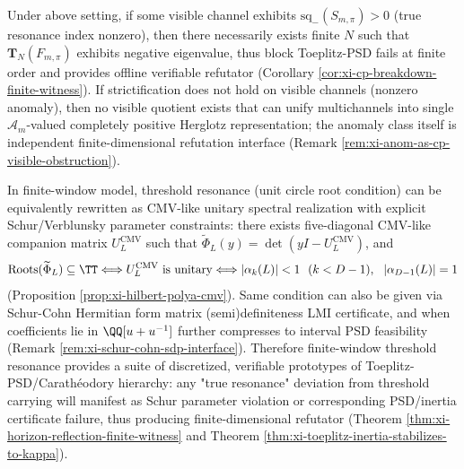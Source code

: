 \begin{corollary}[True resonance or strictification failure \texorpdfstring{$\Rightarrow$}{=>} finite-dimensional refutator]\label{cor:xi-multichannel-witness-kappa-or-anom}
Under above setting, if some visible channel exhibits \(\mathrm{sq}_-(S_{m,\pi})>0\) (true resonance index nonzero),
then there necessarily exists finite \(N\) such that \(\mathbf{T}_N(F_{m,\pi})\) exhibits negative eigenvalue, thus block Toeplitz-PSD fails at finite order and provides offline verifiable refutator (Corollary \ref{cor:xi-cp-breakdown-finite-witness}).
If strictification does not hold on visible channels (nonzero anomaly), then no visible quotient exists that can unify multichannels into single \(\mathcal{A}_m\)-valued completely positive Herglotz representation; the anomaly class itself is independent finite-dimensional refutation interface (Remark \ref{rem:xi-anom-as-cp-visible-obstruction}).
\end{corollary}

\begin{theorem}\label{thm:xi-finite-window-threshold-resonance-inverse-spectral}
In finite-window model, threshold resonance (unit circle root condition) can be equivalently rewritten as CMV-like unitary spectral realization with explicit Schur/Verblunsky parameter constraints:
there exists five-diagonal CMV-like companion matrix \(U_L^{\mathrm{CMV}}\) such that
\(\widetilde\Phi_L(y)=\det(yI-U_L^{\mathrm{CMV}})\), and
\[
\mathrm{Roots}(\widetilde\Phi_L)\subseteq\TT
\Longleftrightarrow
U_L^{\mathrm{CMV}}\ \text{is unitary}
\Longleftrightarrow
|\alpha_k(L)|<1\ \ (k< D-1),\ \ |\alpha_{D-1}(L)|=1
\]
(Proposition \ref{prop:xi-hilbert-polya-cmv}).
Same condition can also be given via Schur-Cohn Hermitian form matrix (semi)definiteness LMI certificate, and when coefficients lie in \(\QQ[u+u^{-1}]\) further compresses to interval PSD feasibility (Remark \ref{rem:xi-schur-cohn-sdp-interface}).
Therefore finite-window threshold resonance provides a suite of discretized, verifiable prototypes of Toeplitz-PSD/Carathéodory hierarchy: any "true resonance" deviation from threshold carrying will manifest as Schur parameter violation or corresponding PSD/inertia certificate failure, thus producing finite-dimensional refutator (Theorem \ref{thm:xi-horizon-reflection-finite-witness} and Theorem \ref{thm:xi-toeplitz-inertia-stabilizes-to-kappa}).
\end{theorem}

